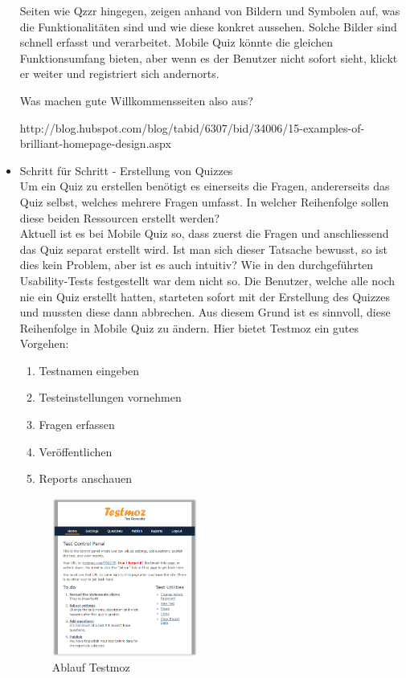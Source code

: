 \begin{itemize}
		Seiten wie Qzzr \cite{qzzr.com} hingegen, zeigen anhand von Bildern und Symbolen auf, was die Funktionalitäten sind und wie diese konkret aussehen. Solche Bilder sind schnell erfasst  und verarbeitet.
		Mobile Quiz könnte die gleichen Funktionsumfang bieten, aber wenn es der Benutzer nicht sofort sieht, klickt er weiter und registriert sich andernorts.
		
		Was machen gute Willkommensseiten also aus?
		
		http://blog.hubspot.com/blog/tabid/6307/bid/34006/15-examples-of-brilliant-homepage-design.aspx
		
		\newpage
		\item Schritt für Schritt - Erstellung von Quizzes \\
		Um ein Quiz zu erstellen benötigt es einerseits die Fragen, andererseits das Quiz selbst, welches mehrere Fragen umfasst. In welcher Reihenfolge sollen diese beiden Ressourcen erstellt werden? \\
		Aktuell ist es bei Mobile Quiz so, dass zuerst die Fragen und anschliessend das Quiz separat erstellt wird. Ist man sich dieser Tatsache bewusst, so ist dies kein Problem, aber ist es auch intuitiv? Wie in den durchgeführten Usability-Tests festgestellt war dem nicht so. Die Benutzer, welche alle noch nie ein Quiz erstellt hatten, starteten sofort mit der Erstellung des Quizzes und mussten diese dann abbrechen.
		Aus diesem Grund ist es sinnvoll, diese Reihenfolge in Mobile Quiz zu ändern. Hier bietet Testmoz \cite{testmoz.com} ein gutes Vorgehen:
		
		\begin{enumerate}
			\item Testnamen eingeben
			\item Testeinstellungen vornehmen
			\item Fragen erfassen
			\item Veröffentlichen
			\item Reports anschauen
		\end{enumerate}
		
		\begin{figure}[h]
			\centering
			\includegraphics[width=0.45\textwidth]{Images/Testmoz2.PNG}
			\caption{Ablauf Testmoz}
		\end{figure}
		

\end{itemize}
